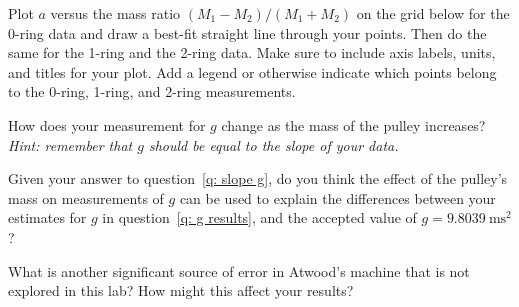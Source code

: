 \documentclass[addpoints]{physlabs}
\begin{document}
\begin{postlab}
    Plot $a$ versus the mass ratio $(M_1-M_2)/(M_1+M_2)$ on the grid below for the 0-ring data and draw a best-fit straight line through your points. Then do the same for the 1-ring and the 2-ring data. Make sure to include axis labels, units, and titles for your plot. Add a legend or otherwise indicate which points belong to the 0-ring, 1-ring, and 2-ring measurements.\\[0em]

    \begin{center}
    \end{center}

    \filbreak
    \question[1] \label{q: slope g} How does your measurement for $g$ change as the mass of the pulley increases? \textsl{Hint: remember that $g$ should be equal to the slope of your data.}
    \begin{solution}[3cm]
        
    \end{solution}

    \filbreak
    \question[1] Given your answer to question~\ref{q: slope g}, do you think the effect of the pulley's mass on measurements of $g$ can be used to explain the differences between your estimates for $g$ in question~\ref{q: g results}, and the accepted value of $g=\qty{9.8039}{\meter\second^2}$?
    \begin{solution}[2cm]
        
    \end{solution}

    \filbreak
    \question[1] What is another significant source of error in Atwood's machine that is not explored in this lab? How might this affect your results?
    \begin{solution}[2cm]
        

\end{solution}
\end{postlab}
\end{document}
